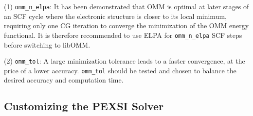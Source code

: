 \documentclass{report}
\begin{document}
(1) \texttt{omm\_n\_elpa}: It has been demonstrated that OMM is optimal at later stages of an SCF cycle where the electronic structure is closer to its local minimum, requiring only one CG iteration to converge the minimization of the OMM energy functional. It is therefore recommended to use ELPA for \texttt{omm\_n\_elpa} SCF steps before switching to libOMM.

(2) \texttt{omm\_tol}: A large minimization tolerance leads to a faster convergence, at the price of a lower accuracy. \texttt{omm\_tol} should be tested and chosen to balance the desired accuracy and computation time.

\subsection{Customizing the PEXSI Solver}
\label{subsec:setter_pexsi}
\end{document}
